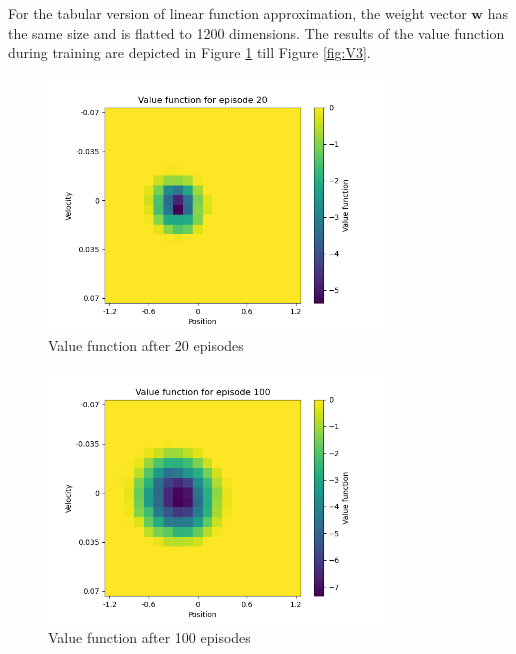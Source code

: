 \documentclass{article}
\newcommand{\wb}{\mathbf{w}}
\begin{document}
For the tabular version of linear function approximation, the weight vector $\wb$ has the same size and is flatted to 1200 dimensions. The results of the value function during training are depicted in Figure \ref{fig:V1} till Figure \ref{fig:V3}.

\begin{figure}[H]
    \centering
    \includegraphics[width=0.8\textwidth]{images/document/value_function_episode20.png}
    \caption{Value function after 20 episodes}
    \label{fig:V1}
\end{figure}

\begin{figure}[H]
    \centering
    \includegraphics[width=0.8\textwidth]{images/document/value_function_episode100.png}
    \caption{Value function after 100 episodes}
    \label{fig:V2}
\end{figure}
\end{document}
